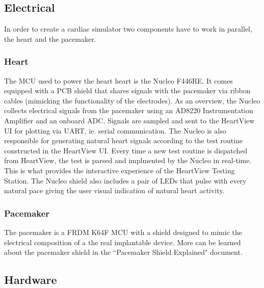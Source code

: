 \documentclass[11pt,fleqn]{book} %
\begin{document}


\subsection{Electrical}

In order to create a cardiac simulator two components have to work in parallel, the heart and the pacemaker. 


\subsubsection{Heart}

The \ac{MCU} used to power the heart heart is the Nucleo F446RE. It comes equipped with a \ac{PCB} shield that shares signals with the pacemaker via ribbon cables (mimicking the functionality of the electrodes). As an overview, the Nucleo collects electrical signals from the pacemaker using an AD8220 Instrumentation Amplifier and an onboard \ac{ADC}. Signals are sampled and sent to the HeartView UI for plotting via \ac{UART}, ie. serial communication. The Nucleo is also responsible for generating natural heart signals according to the test routine constructed in the HeartView UI. Every time a new test routine is dispatched from HeartView, the test is parsed and implmented by the Nucleo in real-time. This is what provides the interactive experience of the HeartView Testing Station. The Nucleo shield also includes a pair of LEDs that pulse with every natural pace giving the user visual indication of natural heart activity.

\subsubsection{Pacemaker}

The pacemaker is a FRDM K64F \ac{MCU} with a shield designed to mimic the electrical composition of a the real implantable device. More can be learned about the pacemaker shield in the ``Pacemaker Shield Explained" document.


\subsection{Hardware}
\end{document}
